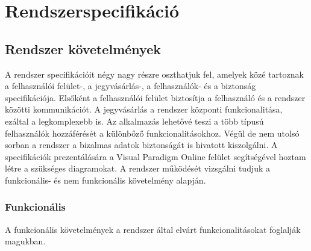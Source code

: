 \chapter{Rendszerspecifikáció} \label{fejezet3}

\section {Rendszer követelmények}

A rendszer specifikációit négy nagy részre oszthatjuk fel, amelyek közé tartoznak a felhasználói felület-, a jegyvásárlás-, a felhasználók- és a biztonság specifikációja. Elsőként a felhasználói felület biztosítja a felhasználó és a rendszer közötti kommunikációt. A jegyvásárlás a rendszer központi funkcionalitása, ezáltal a legkomplexebb is. Az alkalmazás lehetővé teszi a több típusú felhasználók hozzáférését a különbőző funkcionalitásokhoz. Végül de nem utolsó sorban a rendszer a bizalmas adatok biztonságát is hivatott kiszolgálni. A specifikációk prezentálására a Visual Paradigm Online felület segítségével hoztam létre a szükséges diagramokat. A rendszer működését vizsgálni tudjuk a funkcionális- és nem funkcionális követelmény alapján.
\subsection {Funkcionális}

A funkcionális követelmények a rendszer által elvárt funkcionalitásokat foglalják magukban.

